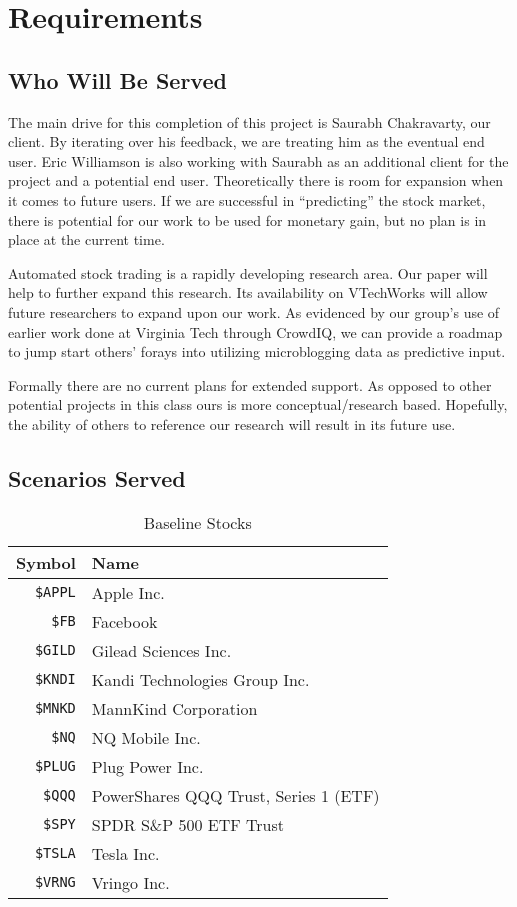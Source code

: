 
\section{Requirements}\label{requirements}

\subsection{Who Will Be Served}

The main drive for this completion of this project is Saurabh Chakravarty, our client.
By iterating over his feedback, we are treating him as the eventual end user.
Eric Williamson is also working with Saurabh as an additional client for the project and a potential end user.
Theoretically there is room for expansion when it comes to future users.
If we are successful in “predicting” the stock market, there is potential for our work to be used for monetary gain, but no plan is in place at the current time. 

Automated stock trading is a rapidly developing research area.
Our paper will help to further expand this research.
Its availability on VTechWorks will allow future researchers to expand upon our work.
As evidenced by our group's use of earlier work done at Virginia Tech through CrowdIQ, we can provide a roadmap to jump start others' forays into utilizing microblogging data as predictive input.

Formally there are no current plans for extended support.
As opposed to other potential projects in this class ours is more conceptual/research based.
Hopefully, the ability of others to reference our research will result in its future use.

\subsection{Scenarios Served}

\begin{table}
  \centering
  \begin{tabular}{ | r | l | }
    \hline
    Symbol & Name \\ \hline
    \texttt{\$APPL} & Apple Inc. \\ \hline
    \texttt{\$FB} & Facebook \\ \hline
    \texttt{\$GILD} & Gilead Sciences Inc. \\ \hline
    \texttt{\$KNDI} & Kandi Technologies Group Inc. \\ \hline
    \texttt{\$MNKD} & MannKind Corporation \\ \hline
    \texttt{\$NQ} & NQ Mobile Inc. \\\hline
    \texttt{\$PLUG} & Plug Power Inc. \\\hline
    \texttt{\$QQQ} & PowerShares QQQ Trust, Series 1 (ETF) \\\hline
    \texttt{\$SPY} & SPDR S\&P 500 ETF Trust \\\hline
    \texttt{\$TSLA} & Tesla Inc. \\\hline
    \texttt{\$VRNG} & Vringo Inc. \\\hline
  \end{tabular}
  \caption{Baseline Stocks}\label{tab:stocks}
\end{table}

